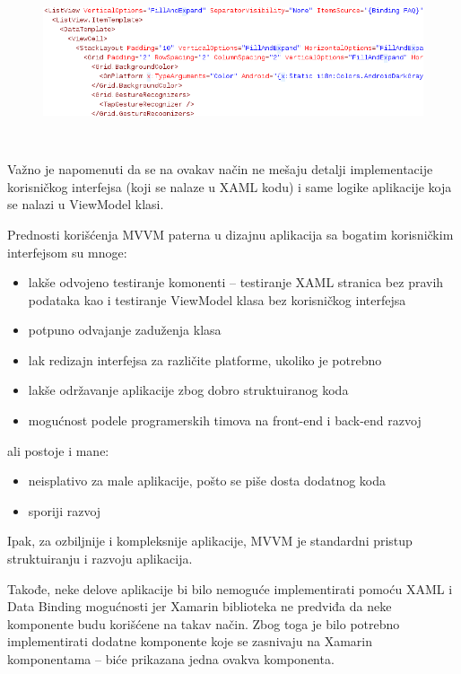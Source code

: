 \documentclass[a4paper]{article}
\newcommand\liststyleLx{%
\renewcommand\labelitemi{•}
\renewcommand\labelitemii{◦}
\renewcommand\labelitemiii{${\blacksquare}$}
\renewcommand\labelitemiv{•}
}
\newcommand\liststyleLxi{%
\renewcommand\labelitemi{•}
\renewcommand\labelitemii{◦}
\renewcommand\labelitemiii{${\blacksquare}$}
\renewcommand\labelitemiv{•}
}
\begin{document}
\begin{figure}
\centering
\includegraphics[width=170mm,height=48.56mm]{msc-img39.png}
\end{figure}
Važno je napomenuti da se na ovakav način ne mešaju detalji
implementacije korisničkog interfejsa (koji se nalaze u XAML kodu) i
same logike aplikacije koja se nalazi u ViewModel klasi.

Prednosti korišćenja MVVM paterna u dizajnu aplikacija sa bogatim
korisničkim interfejsom su mnoge:

\liststyleLx
\begin{itemize}
\item lakše odvojeno testiranje komonenti – testiranje XAML stranica bez
pravih podataka kao i testiranje ViewModel klasa bez korisničkog
interfejsa
\item potpuno odvajanje zaduženja klasa
\item lak redizajn interfejsa za različite platforme, ukoliko je
potrebno
\item lakše održavanje aplikacije zbog dobro struktuiranog koda
\item mogućnost podele programerskih timova na front-end i back-end
razvoj
\end{itemize}
ali postoje i mane:

\liststyleLxi
\begin{itemize}
\item neisplativo za male aplikacije, pošto se piše dosta dodatnog koda
\item sporiji razvoj
\end{itemize}
Ipak, za ozbiljnije i kompleksnije aplikacije, MVVM je standardni
pristup struktuiranju i razvoju aplikacija.

Takođe, neke delove aplikacije bi bilo nemoguće implementirati pomoću
XAML i Data Binding mogućnosti jer Xamarin biblioteka ne predviđa da
neke komponente budu korišćene na takav način. Zbog toga je bilo
potrebno implementirati dodatne komponente koje se zasnivaju na Xamarin
komponentama – biće prikazana jedna ovakva komponenta.
\end{document}
